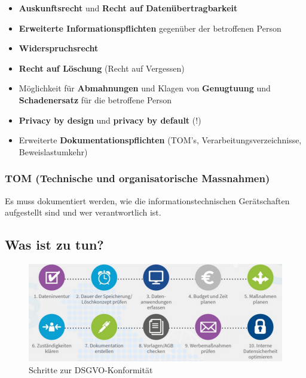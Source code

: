 \begin{itemize}
	\tightlist
	\item \textbf{Auskunftsrecht} und \textbf{Recht auf Datenübertragbarkeit}
	\item \textbf{Erweiterte Informationspflichten} gegenüber der betroffenen
	Person
	\item \textbf{Widerspruchsrecht}
	\item \textbf{Recht auf Löschung} (Recht auf Vergessen)
	\item Möglichkeit für \textbf{Abmahnungen} und Klagen von
	\textbf{Genugtuung} und \textbf{Schadenersatz} für die betroffene
	Person
	\item \textbf{Privacy by design} und \textbf{privacy by default} (!)
	\item Erweiterte \textbf{Dokumentationspflichten} (TOM's,
	Verarbeitungsverzeichnisse, Beweislastumkehr)
\end{itemize}


\subsubsection{TOM (Technische und organisatorische Massnahmen)}

Es muss dokumentiert werden, wie die informationstechnischen
Gerätschaften aufgestellt sind und wer verantwortlich ist.

\subsection{Was ist zu tun?}

\begin{figure}[H]
	\centering
	\includegraphics[width=.9\textwidth]{figures/dsgvoSteps.png}
	\caption{Schritte zur DSGVO-Konformität}
\end{figure}

